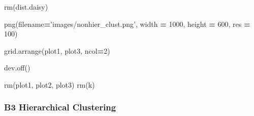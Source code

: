 \documentclass[]{article}
\newenvironment{Shaded}{\begin{snugshade}}{\end{snugshade}}
\newcommand{\KeywordTok}[1]{\textcolor[rgb]{0.13,0.29,0.53}{\textbf{{#1}}}}
\newcommand{\DecValTok}[1]{\textcolor[rgb]{0.00,0.00,0.81}{{#1}}}
\newcommand{\StringTok}[1]{\textcolor[rgb]{0.31,0.60,0.02}{{#1}}}
\newcommand{\NormalTok}[1]{{#1}}
\begin{document}
\begin{Shaded}
\begin{Highlighting}[]
\NormalTok{rm(dist.daisy)}


\NormalTok{png(filename}\KeywordTok{=}\StringTok{'images/nonhier_clust.png'}\NormalTok{, }
    \NormalTok{width }\KeywordTok{=} \DecValTok{1000}\NormalTok{, height }\KeywordTok{=} \DecValTok{600}\NormalTok{, res }\KeywordTok{=} \DecValTok{100}\NormalTok{)}

\NormalTok{grid.arrange(plot1, plot3, ncol}\KeywordTok{=}\DecValTok{2}\NormalTok{)}

\NormalTok{dev.off()}

\NormalTok{rm(plot1, plot2, plot3)}
\NormalTok{rm(k)}
\end{Highlighting}
\end{Shaded}

\subsubsection{B3 Hierarchical
Clustering}\label{b3-hierarchical-clustering}
\end{document}

